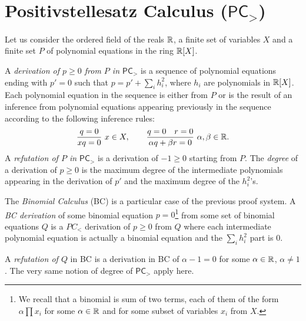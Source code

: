 \documentclass[a4paper,twoside,justified]{tufte-handout}
\begin{document}
 

\section{Positivstellesatz Calculus ($\mathsf{PC}_>$)}

Let us consider the ordered field of the reals $\mathbb{R}$, a finite set of variables $X$ and a finite set $P$ of polynomial equations in the ring $\mathbb{R}[X]$. 

A \emph{derivation of  $p\geq 0$ from $P$ in $\mathsf{PC}_>$} is a sequence of polynomial equations ending with $p'=0$ such that $p=p'+\sum_i h_i^2$, where $h_i$ are polynomials in $\mathbb{R}[X]$.  
Each polynomial equation in the sequence is either from $P$ or is the result of an inference from polynomial equations appearing previously in the sequence according to the following inference rules:
\begin{equation}
\label{eq:positivstellesatz-inference}
    \frac{q=0}{xq=0}\ x\in X,\qquad \frac{q=0\quad r=0}{\alpha q +\beta r=0}\ \alpha,\beta\in \mathbb{R}.
\end{equation}
%
%
A \emph{refutation of $P$ in $\mathsf{PC}_>$} is a derivation of $-1\geq 0$ starting from $P$. 
The \emph{degree} of a derivation of $p\geq 0$ is the maximum degree of the intermediate polynomials appearing in the derivation of $p'$ and the maximum degree of the $h_i^2$'s.
 
 
The \emph{Binomial Calculus} (BC) is a particular case of the previous proof system. A \emph{BC derivation} of some binomial equation $p=0$\footnote{
We recall that a binomial is sum of two terms, each of them of the form $\alpha\prod x_i$ for some $\alpha\in \mathbb{R}$ and for some subset of variables $x_i$ from $X$.
} from some set of binomial equations $Q$
is a $PC_<$ derivation of $p\geq 0$ from $Q$ where each intermediate polynomial equation is actually a binomial equation and the $\sum_ih_i^2$ part is $0$.

A \emph{refutation of $Q$} in BC is a derivation in BC of $\alpha -1=0$ for some $\alpha\in \mathbb{R}$, $\alpha\neq 1$. The very same notion of degree of $\mathsf{PC}_>$ apply here.

%
%
\end{document}
